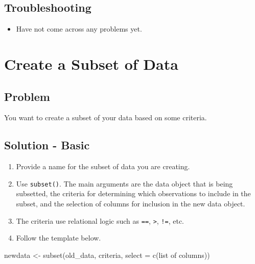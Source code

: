 \documentclass[
]{book}
\newenvironment{Shaded}{\begin{snugshade}}{\end{snugshade}}
\newcommand{\AttributeTok}[1]{\textcolor[rgb]{0.77,0.63,0.00}{#1}}
\newcommand{\FunctionTok}[1]{\textcolor[rgb]{0.00,0.00,0.00}{#1}}
\newcommand{\NormalTok}[1]{#1}
\newcommand{\OtherTok}[1]{\textcolor[rgb]{0.56,0.35,0.01}{#1}}
\providecommand{\tightlist}{%
  \setlength{\itemsep}{0pt}\setlength{\parskip}{0pt}}
\begin{document}
\hypertarget{troubleshooting-13}{%
\subsection{Troubleshooting}\label{troubleshooting-13}}

\begin{itemize}
\tightlist
\item
  Have not come across any problems yet.
\end{itemize}

\hypertarget{subset}{%
\section{Create a Subset of Data}\label{subset}}

\hypertarget{problem-16}{%
\subsection{Problem}\label{problem-16}}

You want to create a subset of your data based on some criteria.

\hypertarget{solution---basic}{%
\subsection{Solution - Basic}\label{solution---basic}}

\begin{enumerate}
\def\labelenumi{\arabic{enumi}.}
\tightlist
\item
  Provide a name for the subset of data you are creating.
\item
  Use \texttt{subset()}. The main arguments are the data object that is being subsetted, the criteria for determining which observations to include in the subset, and the selection of columns for inclusion in the new data object.
\item
  The criteria use relational logic such as \texttt{==}, \texttt{\textgreater{}}, \texttt{!=}, etc.
\item
  Follow the template below.
\end{enumerate}

\begin{Shaded}
\begin{Highlighting}[]
\NormalTok{newdata }\OtherTok{\textless{}{-}} \FunctionTok{subset}\NormalTok{(old\_data, criteria, }\AttributeTok{select =} \FunctionTok{c}\NormalTok{(list of columns))}
\end{Highlighting}
\end{Shaded}
\end{document}
